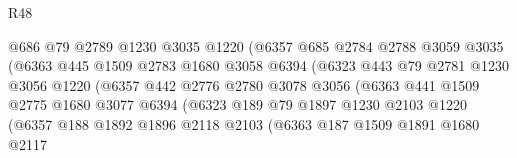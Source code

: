 \begin{lexlean}{R48}
\begin{coremodule}
                                @686
                                @79
                                @2789
                                @1230
                                @3035
                                @1220
                                (@6357
                                  @685
                                  @2784
                                  @2788
                                  @3059
                                  @3035
                                  (@6363
                                    @445
                                    @1509
                                    @2783
                                    @1680
                                    @3058
                                    @6394
                                    (@6323
                                      @443
                                      @79
                                      @2781
                                      @1230
                                      @3056
                                      @1220
                                      (@6357
                                        @442
                                        @2776
                                        @2780
                                        @3078
                                        @3056
                                        (@6363
                                          @441
                                          @1509
                                          @2775
                                          @1680
                                          @3077
                                          @6394
                                          (@6323
                                            @189
                                            @79
                                            @1897
                                            @1230
                                            @2103
                                            @1220
                                            (@6357
                                              @188
                                              @1892
                                              @1896
                                              @2118
                                              @2103
                                              (@6363
                                                @187
                                                @1509
                                                @1891
                                                @1680
                                                @2117

\end{coremodule}
\end{lexlean}
